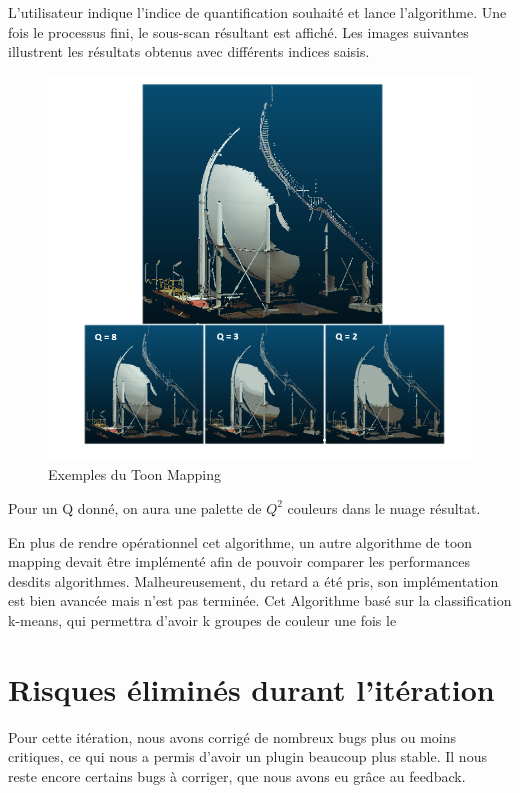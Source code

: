 \documentclass[12pt,titlepage,french]{article}
\begin{document}
L'utilisateur indique l'indice de quantification souhaité et lance l'algorithme. Une fois le processus fini, le sous-scan résultant est affiché. Les images suivantes illustrent les résultats obtenus avec différents indices saisis.
\begin{figure}[H]
 \caption{\label{} Exemples du Toon Mapping}
 \begin{center}
 \includegraphics[width=1\textwidth]{./img/ExpToonMapping.PNG}
  \end{center}
\end{figure}
Pour un Q donné, on aura une palette de $Q^2$ couleurs dans le nuage résultat.\newline

En plus de rendre opérationnel cet algorithme, un autre algorithme de toon mapping devait être implémenté afin de pouvoir comparer les performances desdits algorithmes. Malheureusement, du retard a été pris, son implémentation est bien avancée mais n'est pas terminée. Cet Algorithme basé sur la classification k-means, qui permettra d'avoir k groupes de couleur une fois le

\section{Risques éliminés durant l'itération}

Pour cette itération, nous avons corrigé de nombreux bugs plus ou moins critiques, ce qui nous a permis d'avoir un plugin beaucoup plus stable. Il nous reste encore certains bugs à corriger, que nous avons eu grâce au feedback.
\end{document}
